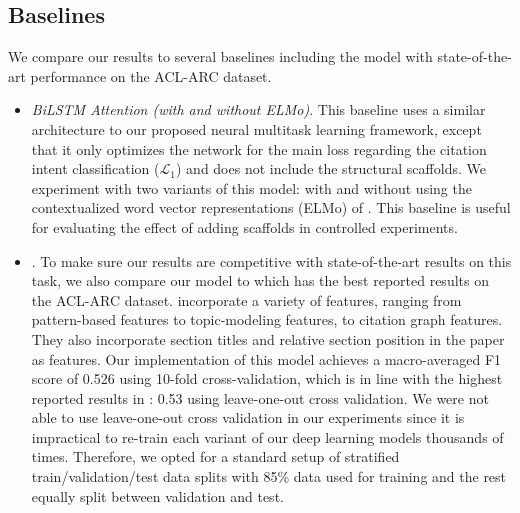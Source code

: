 \documentclass[11pt,a4paper]{article}
\newcommand{\acldata}{ACL-ARC\xspace}
\newcommand{\calL}{\mathcal{L}}
\begin{document}
\subsection{Baselines}
\label{subsec:comparison}


We compare our results to several baselines including the model with state-of-the-art performance on the \acldata dataset.
\begin{itemize}[leftmargin=6pt]
\setlength\itemsep{6pt}

    \item \textit{BiLSTM Attention (with and without ELMo)}. This baseline uses a similar architecture to our proposed neural multitask learning framework, except that it only optimizes the network for the main loss regarding the citation intent classification ($\calL_1$) and does not include the structural scaffolds.
    We experiment with two variants of this model: with and without using the contextualized word vector representations (ELMo) of \citet{Peters2018DeepCW}.
    This baseline is useful for evaluating the effect of adding scaffolds in controlled experiments.

    \item \textit{\citet{jurgens2018}}. To make sure our results are competitive with state-of-the-art results on this task, we also compare our model to \citet{jurgens2018} which has the best reported results on the \acldata dataset. \citet{jurgens2018} incorporate a variety of features, ranging from pattern-based features to topic-modeling features, to citation graph features. They also incorporate section titles and relative section position in the paper as features.
    Our implementation of this model achieves a macro-averaged F1 score of 0.526 using 10-fold cross-validation, which is in line with the highest reported results in \citet{jurgens2018}: 0.53 using leave-one-out cross validation. We were not able to use leave-one-out cross validation in our experiments since it is impractical to re-train each variant of our deep learning models thousands of times. Therefore, we opted for a standard setup of stratified train/validation/test data splits with 85\% data used for training and the rest equally split between validation and test.

\end{itemize}
\end{document}
